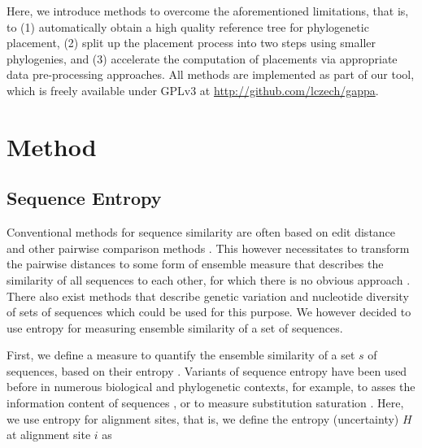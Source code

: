 Here, we introduce methods to overcome the aforementioned limitations, that is, to
(1) automatically obtain a high quality reference tree for phylogenetic placement,
(2) split up the placement process into two steps using smaller phylogenies,
and (3) accelerate the computation of placements via appropriate data pre-processing approaches.
All methods are implemented as part of our  tool,
which is freely available under GPLv3 at \url{http://github.com/lczech/gappa}.


\section{Method}
\label{ch:AutomaticTrees:sec:Method}


\subsection{Sequence Entropy}
\label{ch:AutomaticTrees:sec:Method:sub:SequenceSimilarity}

Conventional methods for sequence similarity are often based on edit distance
and other pairwise comparison methods \cite{Needleman1970,Smith1981,Altschul1990}.
This however necessitates to transform the pairwise distances to some form of ensemble measure
that describes the similarity of all sequences to each other, for which there is no obvious approach \cite{Zhou2006}.
There also exist methods that describe genetic variation and
nucleotide diversity of sets of sequences \cite{Nei1979,Blaisdell1986} which could be used for this purpose.
We however decided to use entropy for measuring ensemble similarity of a set of sequences.

First, we define a measure to quantify the ensemble similarity of a set $s$ of sequences,
based on their entropy \cite{Shannon1951}.
Variants of sequence entropy have been used before in numerous biological and phylogenetic contexts,
for example, to asses the information content of sequences
\cite{Schmitt1997,Vinga2003,Vinga2004,Li2005,Criscuolo2010,Comin2012,Vinga2014},
or to measure substitution saturation \cite{Xia2003}.
Here, we use entropy for alignment sites, that is, we define the entropy (uncertainty) $H$ at alignment site $i$ as


